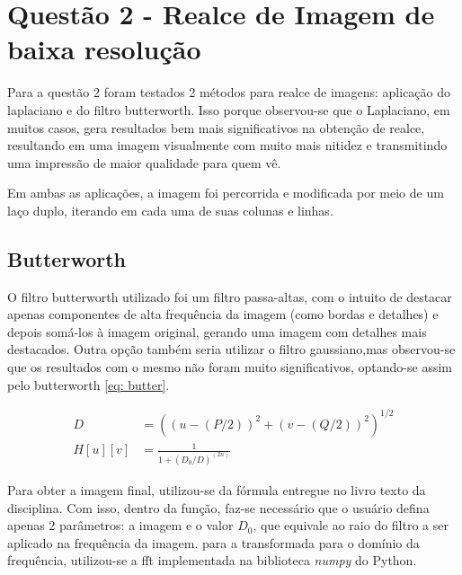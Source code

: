 \documentclass{article}
\begin{document}
\section{Questão 2 - Realce de Imagem de baixa resolução}
Para a questão 2 foram testados 2 métodos para realce de imagens: aplicação do laplaciano e do filtro butterworth. Isso porque observou-se que o Laplaciano, em muitos casos, gera resultados bem mais significativos na obtenção de realce, resultando em uma imagem visualmente com muito mais nitidez e transmitindo uma impressão de maior qualidade para quem vê.

Em ambas as aplicações, a imagem foi percorrida e modificada por meio de um laço duplo, iterando em cada uma de suas colunas e linhas.

\subsection{Butterworth} 

O filtro butterworth utilizado foi um filtro passa-altas, com o intuito de destacar apenas componentes de alta frequência da imagem (como bordas e detalhes) e depois somá-los à imagem original, gerando uma imagem com detalhes mais destacados. Outra opção também seria utilizar o filtro gaussiano,mas observou-se que os resultados com o mesmo não foram muito significativos, optando-se assim pelo butterworth \ref{eq: butter}.

\begin{align} \label{eq: butter}
     D &= ((u - (P/2))^2 + (v - (Q/2))^2)^{1 / 2} \\
	H[u][v] &= \frac{1}{1 + (D_0/D)^(2n)}
\end{align}

Para obter a imagem final, utilizou-se da fórmula entregue no livro texto da disciplina. Com isso, dentro da função, faz-se necessário que o usuário defina apenas 2 parâmetros: a imagem e o valor $D_0$, que equivale ao raio do filtro a ser aplicado na frequência da imagem. para a transformada para o domínio da frequência, utilizou-se a fft implementada na biblioteca \textit{numpy} do Python.
\end{document}
